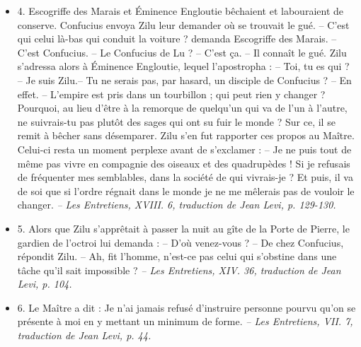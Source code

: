\begin{itemize}
\item 4. \newline Escogriffe des Marais et Éminence Engloutie bêchaient et labouraient de conserve. Confucius envoya Zilu leur demander où se trouvait le gué. \newline -- C’est qui celui là-bas qui conduit la voiture ? demanda Escogriffe des Marais. \newline -- C’est Confucius. \newline -- Le Confucius de Lu ? \newline -- C’est ça. \newline -- Il connaît le gué.  \newline Zilu s’adressa alors à Éminence Engloutie, lequel l’apostropha :  \newline -- Toi, tu es qui ? \newline -- Je suis Zilu.\newline  -- Tu ne serais pas, par hasard, un disciple de Confucius ? \newline -- En effet.  \newline -- L’empire est pris dans un tourbillon ; qui peut rien y changer ? Pourquoi, au lieu d’être à la remorque de quelqu’un qui va de l’un à l’autre, ne suivrais-tu pas plutôt des sages qui ont su fuir le monde ? \newline  Sur ce, il se remit à bêcher sans désemparer. Zilu s’en fut rapporter ces propos au Maître. Celui-ci resta un moment perplexe avant de s’exclamer :  \newline  -- Je ne puis tout de même pas vivre en compagnie des oiseaux et des quadrupèdes ! Si je refusais de fréquenter mes semblables, dans la société de qui vivrais-je ? Et puis, il va de soi que si l’ordre régnait dans le monde je ne me mêlerais pas de vouloir le changer.  \textit{\small -- Les Entretiens, XVIII. 6, traduction de Jean Levi, p. 129-130.  }

\item 5. \newline Alors que Zilu s’apprêtait à passer la nuit au gîte de la Porte de Pierre, le gardien de l’octroi lui demanda : \newline-- D’où venez-vous ? \newline -- De chez Confucius, répondit Zilu. \newline-- Ah, fit l’homme, n’est-ce pas celui qui s’obstine dans une tâche qu’il sait impossible ?  \textit{\small -- Les Entretiens, XIV. 36, traduction de Jean Levi, p. 104.  }
\item 6. \newline Le Maître a dit : Je n’ai jamais refusé d’instruire personne pourvu qu’on se présente à moi en y mettant un minimum de forme. \textit{\small -- Les Entretiens, VII. 7, traduction de Jean Levi, p. 44.   
}
\end{itemize}
